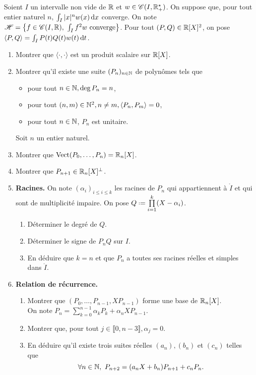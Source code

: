 \begin{exercice}
    Soient $I$ un intervalle non vide de $\mathbb{R}$ et $w \in \mathscr{C}(I, \mathbb{R}^\star_+)$. On suppose que, pour tout entier naturel $n$, $\int_I |x|^n w(x) \, \mathrm{d} x$ converge. On note $\mathscr{H} = \left\{ f \in \mathscr{C}(I, \mathbb{R}),\ \int_I f^2 w \text{ converge} \right\}$. Pour tout $(P, Q) \in \mathbb{R}[X]^2$, on pose $\langle P, Q \rangle = \int_I P(t) Q(t) w(t) \, \mathrm{d} t$.
    \begin{enumerate}
        \item Montrer que $\langle \cdot, \cdot \rangle$ est un produit scalaire sur $\mathbb{R}[X]$.
        \item Montrer qu'il existe une suite $(P_n)_{n \in \mathbb{N}}$ de polynômes tels que 
        \begin{itemize}
            \item pour tout $n \in \mathbb{N}, \deg P_n = n$,
            \item pour tout $(n, m) \in \mathbb{N}^2, n \not= m, \langle P_n, P_m \rangle = 0$,
            \item pour tout $n \in \mathbb{N}$, $P_n$ est unitaire.
        \end{itemize}
        Soit $n$ un entier naturel.
        \item Montrer que $\mathrm{Vect}(P_0, \dots, P_n) = \mathbb{R}_n[X]$.
        \item Montrer que $P_{n+1} \in \mathbb{R}_n[X]^\perp$.
        \item \textbf{Racines.} On note $(\alpha_i)_{i \leqslant i \leqslant k}$ les racines de $P_n$ qui appartiennent à $\mathring{I}$ et qui sont de multiplicité impaire. On pose $Q \defeq \prod\limits_{i=1}^k (X - \alpha_i)$.
        \begin{enumerate}
            \item Déterminer le degré de $Q$.
            \item Déterminer le signe de $P_n Q$ sur $I$.
            \item En déduire que $k = n$ et que $P_n$ a toutes ses racines réelles et simples dans $\mathring{I}$.
        \end{enumerate}
        \item \textbf{Relation de récurrence.}
        \begin{enumerate}
            \item Montrer que $(P_0, \dots, P_{n-1}, X P_{n-1})$ forme une base de $\mathbb{R}_n[X]$. \\
        On note $P_n = \sum\limits_{k=0}^{n-1} \alpha_k P_k + \alpha_n X P_{n-1}$.
            \item Montrer que, pour tout $j \in \llbracket 0, n - 3 \rrbracket, \alpha_j = 0$.
            \item En déduire qu'il existe trois suites réelles $(a_n), (b_n)$ et $(c_n)$ telles que 
            $$\forall n \in \mathbb{N},\ P_{n+2} = (a_n X + b_n) P_{n+1} + c_n P_n.$$
        \end{enumerate}
    \end{enumerate}
\end{exercice}

